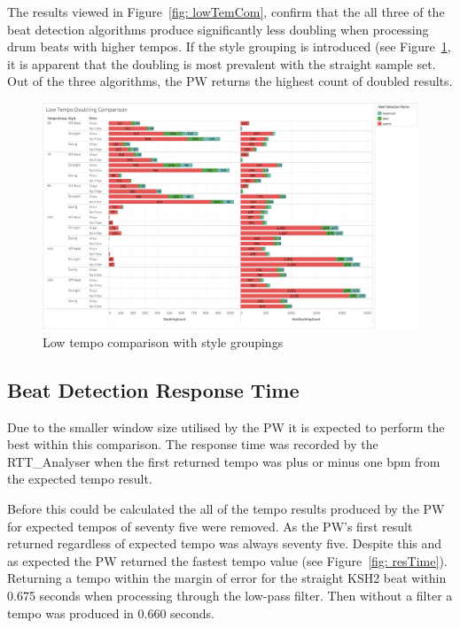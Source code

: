 \documentclass[a4paper, 11pt]{article}
\begin{document}
The results viewed in Figure~\ref{fig: lowTemCom}, confirm that the all three of the beat detection algorithms produce significantly less doubling when processing drum beats with higher tempos. If the style grouping is introduced (see Figure~\ref{fig: lowTemComStyle}, it is apparent that the doubling is most prevalent with the straight sample set. Out of the three algorithms, the PW returns the highest count of doubled results.

\begin{figure}
\centering
\includegraphics[scale=0.25]{images/lowStyle.jpg}
\caption{Low tempo comparison with style groupings}
\label{fig: lowTemComStyle}
\end{figure}

\subsection{Beat Detection Response Time}
Due to the smaller window size utilised by the PW it is expected to perform the best within this comparison. The response time was recorded by the RTT\_Analyser when the first returned tempo was plus or minus one bpm from the expected tempo result. 

Before this could be calculated the all of the tempo results produced by the PW for expected tempos of seventy five were removed. As the PW's first result returned regardless of expected tempo was always seventy five. Despite this and as expected the PW returned the fastest tempo value (see Figure~\ref{fig: resTime}). Returning a tempo within the margin of error for the straight KSH2 beat within 0.675 seconds when processing through the low-pass filter. Then without a filter a tempo was produced in 0.660 seconds. 
\end{document}
